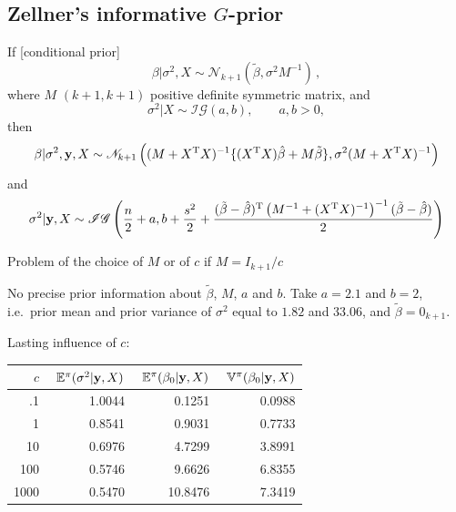 \subsection{Zellner's informative $G$-prior}
\begin{slide}

If [conditional prior] 
$$
\beta|\sigma^2,X\sim\mathscr{N}_{k+1}(\tilde\beta,\sigma^2M^{-1})\,,
$$
where $M$ $(k+1,k+1)$ positive definite symmetric matrix, and 
$$
\sigma^2|X\sim \mathscr{IG}(a,b),\qquad a,b>0,
$$
\pause then
\small
$$
\beta|\sigma^2,\mathbf{y},X\sim
\mathscr{N}_{k+1}\left((M+X^{\mathrm{T}} X)^{-1}
\{(X^{\mathrm{T}} X)\hat\beta+M\tilde\beta\},\sigma^2(M+X^{\mathrm{T}} X)^{-1}\right)
$$
and 
$$
\sigma^2|\mathbf{y},X\sim
\mathscr{IG}\left(\frac{n}{2}+a,b+\frac{s^2}{2}+\frac{(\tilde\beta-\hat\beta)^{\mathrm{T}}
\left(M^{-1}+(X^{\mathrm{T}} X)^{-1}\right)^{-1}(\tilde\beta-\hat\beta)}{2}\right)
$$
\normalsize

\end{slide}
\begin{slide}

Problem of the choice of $M$ or of $c$ if $M=I_{k+1}/c$

\pause
\begin{example}
No precise prior information about $\tilde\beta$, $M$, $a$ and $b$. Take
$a=2.1$ and $b=2$, i.e.~prior mean and prior variance of $\sigma^2$ equal to
$1.82$ and $33.06$, and $\tilde\beta=0_{k+1}$.

\pause
Lasting influence of $c$: 
\small
\begin{center}\begin{tabular}{r r r r}
        $c$ &  $\ \mathbb{E}^\pi(\sigma^2|\by,X)$ & $\ \mathbb{E}^\pi(\beta_0|\by,X)$ & $\ \mathbb{V}^\pi(\beta_0|\by,X)$ \\
    \hline
   .1 &  1.0044 &  0.1251 & 0.0988 \\
   1   &  0.8541 &  0.9031 & 0.7733 \\
  10   &  0.6976 &  4.7299 & 3.8991 \\
 100   &  0.5746 &  9.6626 & 6.8355 \\
1000   &  0.5470 & 10.8476 & 7.3419
\end{tabular}\end{center}
\normalsize
\end{example}

\end{slide}
